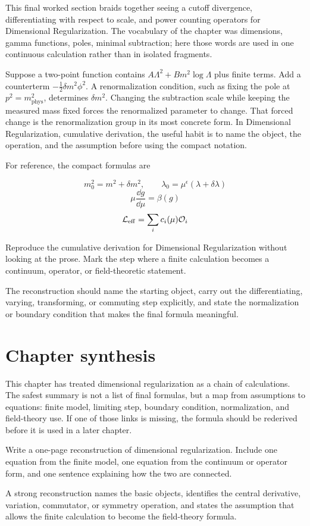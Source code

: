 This final worked section braids together seeing a cutoff divergence, differentiating with respect to scale, and power counting operators for Dimensional Regularization.  The vocabulary of the chapter was dimensions, gamma functions, poles, minimal subtraction; here those words are used in one continuous calculation rather than in isolated fragments.

Suppose a two-point function contains \(A\Lambda^2+B m^2\log\Lambda\) plus finite terms.  Add a counterterm \(-\frac12\delta m^2\phi^2\).  A renormalization condition, such as fixing the pole at \(p^2=m_{\mathrm{phys}}^2\), determines \(\delta m^2\).  Changing the subtraction scale while keeping the measured mass fixed forces the renormalized parameter to change.  That forced change is the renormalization group in its most concrete form.  In Dimensional Regularization, cumulative derivation, the useful habit is to name the object, the operation, and the assumption before using the compact notation.

For reference, the compact formulas are

\[
  m_0^2=m^2+\delta m^2,\qquad \lambda_0=\mu^\epsilon(\lambda+\delta\lambda)
\]
\[
  \mu\frac{\dd g}{\dd\mu}=\beta(g)
\]
\[
  \mathcal L_{\mathrm{eff}}=\sum_i c_i(\mu)\mathcal O_i
\]

\begin{exercise}
Reproduce the cumulative derivation for Dimensional Regularization without looking at the prose.  Mark the step where a finite calculation becomes a continuum, operator, or field-theoretic statement.
\begin{answer}
The reconstruction should name the starting object, carry out the differentiating, varying, transforming, or commuting step explicitly, and state the normalization or boundary condition that makes the final formula meaningful.
\end{answer}
\end{exercise}



\section{Chapter synthesis}

This chapter has treated dimensional regularization as a chain of calculations.  The safest summary is not a list of final formulas, but a map from assumptions to equations: finite model, limiting step, boundary condition, normalization, and field-theory use.  If one of those links is missing, the formula should be rederived before it is used in a later chapter.

\begin{exercise}
Write a one-page reconstruction of dimensional regularization.  Include one equation from the finite model, one equation from the continuum or operator form, and one sentence explaining how the two are connected.
\begin{answer}
A strong reconstruction names the basic objects, identifies the central derivative, variation, commutator, or symmetry operation, and states the assumption that allows the finite calculation to become the field-theory formula.
\end{answer}
\end{exercise}
